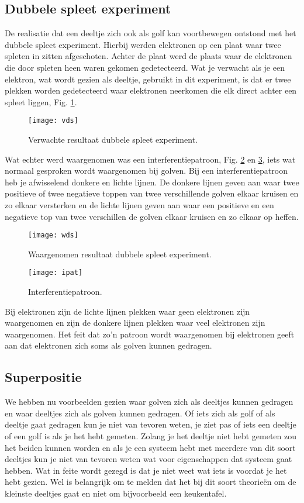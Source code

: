 \documentclass[11pt,fleqn]{book} %
\begin{document}
\subsection{Dubbele spleet experiment}
De realisatie dat een deeltje zich ook als golf kan voortbewegen ontstond met het dubbele spleet experiment. Hierbij werden elektronen op een plaat waar twee spleten in zitten afgeschoten. Achter de plaat werd de plaats waar de elektronen die door spleten heen waren gekomen gedetecteerd. Wat je verwacht als je een elektron, wat wordt gezien als deeltje, gebruikt in dit experiment, is dat er twee plekken worden gedetecteerd waar elektronen neerkomen die elk direct achter een spleet liggen, Fig. \ref{fig:vds}.
\begin{figure}[h]
	\centering\texttt{[image: vds]}
	\caption{Verwachte resultaat dubbele spleet experiment.}
	\label{fig:vds}
\end{figure}
Wat echter werd waargenomen was een interferentiepatroon, Fig. \ref{fig:wds} en \ref{fig:ipat}, iets wat normaal gesproken wordt waargenomen bij golven. Bij een interferentiepatroon heb je afwisselend donkere en lichte lijnen. De donkere lijnen geven aan waar twee positieve of twee negatieve toppen van twee verschillende golven elkaar kruisen en zo elkaar versterken en de lichte lijnen geven aan waar een positieve en een negatieve top van twee verschillen de golven elkaar kruisen en zo elkaar op heffen.
\begin{figure}[h]
	\centering\texttt{[image: wds]}
	\caption{Waargenomen resultaat dubbele spleet experiment.}
	\label{fig:wds}
\end{figure}
\begin{figure}[h]
	\centering\texttt{[image: ipat]}
	\caption{Interferentiepatroon.}
	\label{fig:ipat}
\end{figure}
Bij elektronen zijn de lichte lijnen plekken waar geen elektronen zijn waargenomen en zijn de donkere lijnen plekken waar veel elektronen zijn waargenomen. Het feit dat zo’n patroon wordt waargenomen bij elektronen geeft aan dat elektronen zich soms als golven kunnen gedragen.

\subsection{Superpositie}
We hebben nu voorbeelden gezien waar golven zich als deeltjes kunnen gedragen en waar deeltjes zich als golven kunnen gedragen. Of iets zich als golf of als deeltje gaat gedragen kun je niet van tevoren weten, je ziet pas of iets een deeltje of een golf is als je het hebt gemeten. Zolang je het deeltje niet hebt gemeten zou het beiden kunnen worden en als je een systeem hebt met meerdere van dit soort deeltjes kun je niet van tevoren weten wat voor eigenschappen dat systeem gaat hebben. Wat in feite wordt gezegd is dat je niet weet wat iets is voordat je het hebt gezien. Wel is belangrijk om te melden dat het bij dit soort theorieën om de kleinste deeltjes gaat en niet om bijvoorbeeld een keukentafel. 
\end{document}
